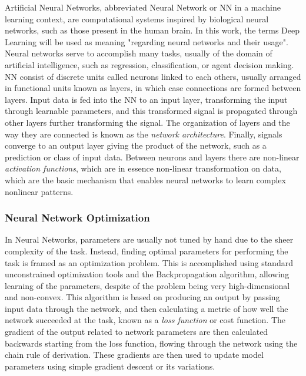 Artificial Neural Networks, abbreviated Neural Network or NN in a machine learning context, are computational systems inspired by biological neural networks, such as those present in the human brain. In this work, the terms Deep Learning will be used as meaning "regarding neural networks and their usage". Neural networks serve to accomplish many tasks, usually of the domain of artificial intelligence, such as regression, classification, or agent decision making. NN consist of discrete units called neurons linked to each others, usually arranged in functional units known as layers, in which case connections are formed between layers. Input data is fed into the NN to an input layer, transforming the input through learnable parameters, and this transformed signal is propagated through other layers further transforming the signal. The organization of layers and the way they are connected is known as the \textit{network architecture}. Finally, signals converge to an output layer giving the product of the network, such as a prediction or class of input data. Between neurons and layers there are non-linear \textit{activation functions}, which are in essence non-linear transformation on data, which are the basic mechanism that enables neural networks to learn complex nonlinear patterns.

\subsubsection*{Neural Network Optimization}

In Neural Networks, parameters are usually not tuned by hand due to the sheer complexity of the task. Instead, finding optimal parameters for performing the task is framed as an optimization problem. This is accomplished using standard unconstrained optimization tools and the Backpropagation algorithm, allowing learning of the parameters, despite of the problem being very high-dimensional and non-convex. This algorithm is based on producing an output by passing input data through the network, and then calculating a metric of how well the network succeeded at the task, known as a \textit{loss function} or cost function. The gradient of the output related to network parameters are then calculated backwards starting from the loss function, flowing through the network using the chain rule of derivation. These gradients are then used to update model parameters using simple gradient descent or its variations. 

